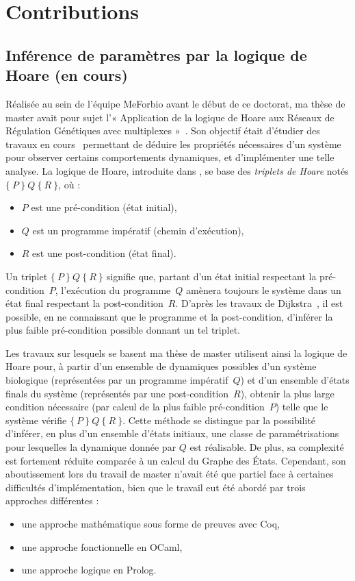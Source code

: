\chapter{Contributions}

\newcommand{\hoare}[3]{\{\ #1\ \}\ #2\ \{\ #3\ \}}

\section{Inférence de paramètres par la logique de Hoare \normalsize(en cours)}
\label{sec:hoare}

Réalisée au sein de l'équipe MeForbio avant le début de ce doctorat, ma thèse de master avait pour sujet l'« Application de la logique de Hoare aux Réseaux de Régulation Génétiques avec multiplexes »~\cite{Folschette2011}.
Son objectif était d'étudier des travaux en cours~\cite{khalis-bernot-comet-richard-roux-siebert-UnPublished} permettant de déduire les propriétés nécessaires d'un système pour observer certains comportements dynamiques, et d'implémenter une telle analyse.
La logique de Hoare, introduite dans \cite{hoare-69}, se base des \emph{triplets de Hoare} notés $\hoare{P}{Q}{R}$, où :
\begin{itemize}
  \item $P$ est une pré-condition (état initial),
  \item $Q$ est un programme impératif (chemin d'exécution),
  \item $R$ est une post-condition (état final).
\end{itemize}
Un triplet $\hoare{P}{Q}{R}$ signifie que, partant d'un état initial respectant la pré-condition~$P$, l'exécution du programme~$Q$ amènera toujours le système dans un état final respectant la post-condition~$R$.
D'après les travaux de Dijkstra~\cite{dijkstra-75}, il est possible, en ne connaissant que le programme et la post-condition,
d'inférer la plus faible pré-condition possible donnant un tel triplet.

Les travaux sur lesquels se basent ma thèse de master utilisent ainsi la logique de Hoare pour,
à partir d'un ensemble de dynamiques possibles d'un système biologique (représentées par un programme impératif~$Q$)
et d'un ensemble d'états finals du système (représentés par une post-condition~$R$),
obtenir la plus large condition nécessaire (par calcul de la plus faible pré-condition~$P$)
telle que le système vérifie $\hoare{P}{Q}{R}$.
Cette méthode se distingue par la possibilité d'inférer, en plus d'un ensemble d'états initiaux, une classe de paramétrisations pour lesquelles la dynamique donnée par $Q$ est réalisable.
De plus, sa complexité est fortement réduite comparée à un calcul du Graphe des États.
Cependant, son aboutissement lors du travail de master n'avait été que partiel face à certaines difficultés d'implémentation, bien que le travail eut été abordé par trois approches différentes :
\begin{itemize}
  \item une approche mathématique sous forme de preuves avec Coq,
  \item une approche fonctionnelle en OCaml,
  \item une approche logique en Prolog.
\end{itemize}

